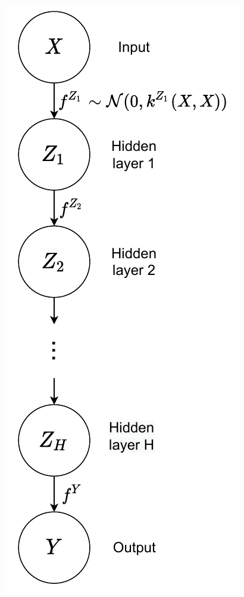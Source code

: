 \documentclass[a4paper,12pt]{article}
\begin{document}
\begin{figure}[H]
\begin{center}
\begin{minipage}[r]{.24\linewidth}
    \includegraphics[width = \linewidth]{deep_gp.pdf}

\end{minipage}
\end{center}
\end{figure}
\end{document}
